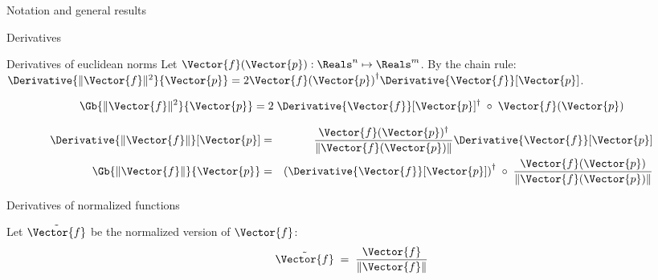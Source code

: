 \begin{plSection}{Notation and general results}
\begin{plSection}{Derivatives}
\begin{plSection}{Derivatives of euclidean norms}
Let $\Vector{f}(\Vector{p}) : \Reals^n \mapsto \Reals^m$.
By the chain rule:
$\Derivative{\| \Vector{f} \|^2}{\Vector{p}}  
=  
2 {\Vector{f}(\Vector{p})}^{\dagger}
 \Derivative{\Vector{f}}[\Vector{p}] $.

\begin{equation}
\Gb{\| \Vector{f} \|^2}{\Vector{p}}  = 
 2 \;\Derivative{\Vector{f}}[\Vector{p}]^\dagger 
 \;\circ \;\Vector{f}(\Vector{p})
\end{equation}

\begin{eqnarray}
\label{eq:norm_derivative}
\Derivative{\| \Vector{f} \|}[\Vector{p}]
& = &
{{\Vector{f}(\Vector{p})^\dagger} 
\over 
{\| \Vector{f}(\Vector{p}) \|}} 
\Derivative{\Vector{f}}[\Vector{p}]  \\
\Gb{\| \Vector{f} \|}{\Vector{p}}
& = &
\left(\Derivative{\Vector{f}}[\Vector{p}]\right)^\dagger
 \;\circ \;{{\Vector{f}(\Vector{p})} 
 \over
  { \| \Vector{f}(\Vector{p})  \|}}
\label{eq:norm_gradient}
\end{eqnarray}

\end{plSection}%
\begin{plSection}{Derivatives of normalized functions}
\label{sec:Derivatives-of-normalized-functions}

Let $\tilde{\Vector{f}}$ be the normalized version of $\Vector{f}$:
\begin{equation}
\tilde{\Vector{f}} \;= \;{{\Vector{f}} \over {\| \Vector{f} \|}}
\end{equation}


\end{plSection}
\end{plSection}
\end{plSection}
